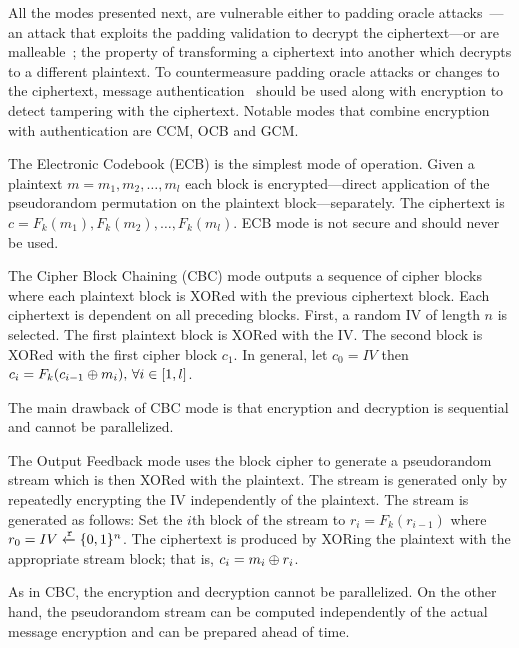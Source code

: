 All the modes presented next, are vulnerable either to padding oracle attacks~\cite{padding_attacks}---an attack that exploits the padding validation to decrypt the ciphertext---or are malleable~\cite{malleability}; the property of transforming a ciphertext into another which decrypts to a different plaintext. To countermeasure padding oracle attacks or changes to the ciphertext, message authentication~\cite{Katz:2014:IMC:2700550} should be used along with encryption to detect tampering with the ciphertext. Notable modes that combine encryption with authentication are CCM, OCB and GCM.

\label{preliminaries:sym:modes:ecb}

The Electronic Codebook (ECB) is the simplest mode of operation. Given a plaintext $m = m_1, m_2, \dots, m_l$ each block is encrypted---direct application of the pseudorandom permutation on the plaintext block---separately. The ciphertext is $c = F_k(m_1), F_k(m_2), \dots, F_k(m_l)$. ECB mode is not secure and should never be used.

\label{preliminaries:sym:modes:cbc}

The Cipher Block Chaining (CBC) mode outputs a sequence of cipher blocks where each plaintext block is XORed with the previous ciphertext block. Each ciphertext is dependent on all preceding blocks. First, a random IV of length $n$ is selected. The first plaintext block is XORed with the IV. The second block is XORed with the first cipher block $c_1$. In general, let $c_0 = IV$ then $c_i = F_k(c_{i-1} \oplus m_i) \mbox{, } \forall i \in [1, l]$.

The main drawback of CBC mode is that encryption and decryption is sequential and cannot be parallelized.

\label{preliminaries:sym:modes:ofb}

The Output Feedback mode uses the block cipher to generate a pseudorandom stream which is then XORed with the plaintext. The stream is generated only by repeatedly encrypting the IV independently of the plaintext. The stream is generated as follows: Set the $i$th block of the stream to $r_i = F_k(r_{i-1})$ where $r_0 = IV \xleftarrow{\mathtt{r}}{\{ 0, 1 \}^{n}}$. The ciphertext is produced by XORing the plaintext with the appropriate stream block; that is, $c_i = m_i \oplus r_i$.

As in CBC, the encryption and decryption cannot be parallelized. On the other hand, the pseudorandom stream can be computed independently of the actual message encryption and can be prepared ahead of time.

